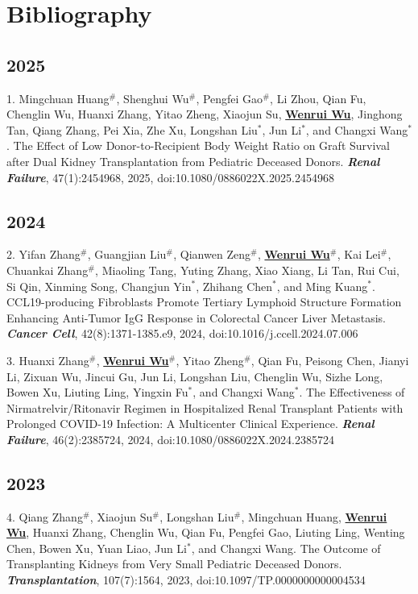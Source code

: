 \documentclass{article}
\begin{document}
\section*{Bibliography}

\subsection*{2025}

1. Mingchuan Huang$^{\#}$, Shenghui Wu$^{\#}$, Pengfei Gao$^{\#}$, Li Zhou, Qian Fu, Chenglin Wu, Huanxi Zhang, Yitao Zheng, Xiaojun Su, \underline{\textbf{Wenrui Wu}}, Jinghong Tan, Qiang Zhang, Pei Xia, Zhe Xu, Longshan Liu$^{*}$, Jun Li$^{*}$, and Changxi Wang$^{*}$. The Effect of Low Donor-to-Recipient Body Weight Ratio on Graft Survival after Dual Kidney Transplantation from Pediatric Deceased Donors. \textbf{\textit{Renal Failure}}, 47(1):2454968, 2025, doi:10.1080/0886022X.2025.2454968

\subsection*{2024}

2. Yifan Zhang$^{\#}$, Guangjian Liu$^{\#}$, Qianwen Zeng$^{\#}$, \underline{\textbf{Wenrui Wu}}$^{\#}$, Kai Lei$^{\#}$, Chuankai Zhang$^{\#}$, Miaoling Tang, Yuting Zhang, Xiao Xiang, Li Tan, Rui Cui, Si Qin, Xinming Song, Changjun Yin$^{*}$, Zhihang Chen$^{*}$, and Ming Kuang$^{*}$. CCL19-producing Fibroblasts Promote Tertiary Lymphoid Structure Formation Enhancing Anti-Tumor IgG Response in Colorectal Cancer Liver Metastasis. \textbf{\textit{Cancer Cell}}, 42(8):1371-1385.e9, 2024, doi:10.1016/j.ccell.2024.07.006

3. Huanxi Zhang$^{\#}$, \underline{\textbf{Wenrui Wu}}$^{\#}$, Yitao Zheng$^{\#}$, Qian Fu, Peisong Chen, Jianyi Li, Zixuan Wu, Jincui Gu, Jun Li, Longshan Liu, Chenglin Wu, Sizhe Long, Bowen Xu, Liuting Ling, Yingxin Fu$^{*}$, and Changxi Wang$^{*}$. The Effectiveness of Nirmatrelvir/Ritonavir Regimen in Hospitalized Renal Transplant Patients with Prolonged COVID-19 Infection: A Multicenter Clinical Experience. \textbf{\textit{Renal Failure}}, 46(2):2385724, 2024, doi:10.1080/0886022X.2024.2385724

\subsection*{2023}

4. Qiang Zhang$^{\#}$, Xiaojun Su$^{\#}$, Longshan Liu$^{\#}$, Mingchuan Huang, \underline{\textbf{Wenrui Wu}}, Huanxi Zhang, Chenglin Wu, Qian Fu, Pengfei Gao, Liuting Ling, Wenting Chen, Bowen Xu, Yuan Liao, Jun Li$^{*}$, and Changxi Wang. The Outcome of Transplanting Kidneys from Very Small Pediatric Deceased Donors. \textbf{\textit{Transplantation}}, 107(7):1564, 2023, doi:10.1097/TP.0000000000004534
\end{document}
